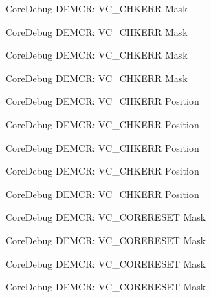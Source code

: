 \begin{DoxyRefList}
\label{deprecated__deprecated000208}%
%
Core\+Debug D\+E\+M\+CR\+: V\+C\+\_\+\+C\+H\+K\+E\+RR Mask 

\label{deprecated__deprecated000350}%
%
Core\+Debug D\+E\+M\+CR\+: V\+C\+\_\+\+C\+H\+K\+E\+RR Mask 

\label{deprecated__deprecated000426}%
%
Core\+Debug D\+E\+M\+CR\+: V\+C\+\_\+\+C\+H\+K\+E\+RR Mask 

\label{deprecated__deprecated000515}%
%
Core\+Debug D\+E\+M\+CR\+: V\+C\+\_\+\+C\+H\+K\+E\+RR Mask  
\item[Member \mbox{\hyperlink{group__CMSIS__CoreDebug_ga10fc7c53bca904c128bc8e1a03072d50}{Core\+Debug\+\_\+\+D\+E\+M\+C\+R\+\_\+\+V\+C\+\_\+\+C\+H\+K\+E\+R\+R\+\_\+\+Pos}} ]\label{deprecated__deprecated000063}%
%
Core\+Debug D\+E\+M\+CR\+: V\+C\+\_\+\+C\+H\+K\+E\+RR Position 

\label{deprecated__deprecated000207}%
%
Core\+Debug D\+E\+M\+CR\+: V\+C\+\_\+\+C\+H\+K\+E\+RR Position 

\label{deprecated__deprecated000349}%
%
Core\+Debug D\+E\+M\+CR\+: V\+C\+\_\+\+C\+H\+K\+E\+RR Position 

\label{deprecated__deprecated000425}%
%
Core\+Debug D\+E\+M\+CR\+: V\+C\+\_\+\+C\+H\+K\+E\+RR Position 

\label{deprecated__deprecated000514}%
%
Core\+Debug D\+E\+M\+CR\+: V\+C\+\_\+\+C\+H\+K\+E\+RR Position  
\item[Member \mbox{\hyperlink{group__CMSIS__CoreDebug_ga906476e53c1e1487c30f3a1181df9e30}{Core\+Debug\+\_\+\+D\+E\+M\+C\+R\+\_\+\+V\+C\+\_\+\+C\+O\+R\+E\+R\+E\+S\+E\+T\+\_\+\+Msk}} ]\label{deprecated__deprecated000070}%
%
Core\+Debug D\+E\+M\+CR\+: V\+C\+\_\+\+C\+O\+R\+E\+R\+E\+S\+ET Mask 

\label{deprecated__deprecated000138}%
%
Core\+Debug D\+E\+M\+CR\+: V\+C\+\_\+\+C\+O\+R\+E\+R\+E\+S\+ET Mask 

\label{deprecated__deprecated000214}%
%
Core\+Debug D\+E\+M\+CR\+: V\+C\+\_\+\+C\+O\+R\+E\+R\+E\+S\+ET Mask 

\label{deprecated__deprecated000277}%
%
Core\+Debug D\+E\+M\+CR\+: V\+C\+\_\+\+C\+O\+R\+E\+R\+E\+S\+ET Mask 


\end{DoxyRefList}
